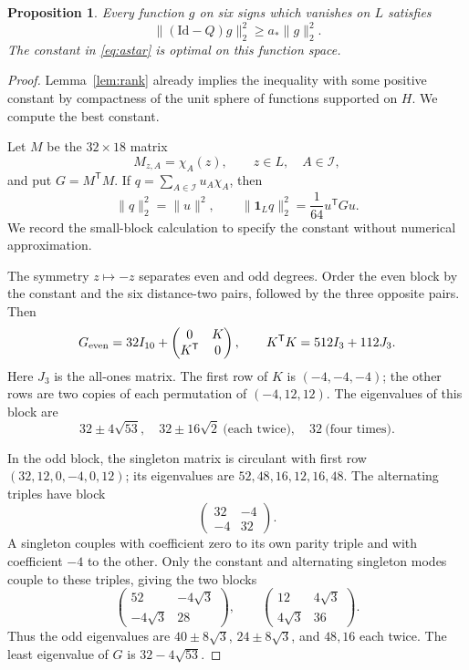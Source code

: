 \documentclass[11pt]{amsart}
\newtheorem{proposition}[theorem]{Proposition}
\theoremstyle{remark}
\newcommand{\one}{\mathbf 1}
\newcommand{\Id}{\mathrm{Id}}
\newcommand{\cI}{\mathcal I}
\newcommand{\astar}{a_*}
\begin{document}
\begin{proposition}\label{prop:coercivity}
Every function $g$ on six signs which vanishes on $L$ satisfies
\begin{equation}\label{eq:coercivity}
 \|(\Id-Q)g\|_2^2\ge\astar\|g\|_2^2.
\end{equation}
The constant in \eqref{eq:astar} is optimal on this function space.
\end{proposition}
\begin{proof}
Lemma~\ref{lem:rank} already implies the inequality with some positive constant by compactness of the unit sphere of functions supported on $H$. We compute the best constant.

Let $M$ be the $32\times18$ matrix
\[
 M_{z,A}=\chi_A(z),\qquad z\in L,\quad A\in\cI,
\]
and put $G=M^{\mathsf T}M$. If $q=\sum_{A\in\cI}u_A\chi_A$, then
\begin{equation}\label{eq:gramnorm}
 \|q\|_2^2=\|u\|^2,\qquad
 \|\one_Lq\|_2^2=\frac1{64}u^{\mathsf T}Gu.
\end{equation}
We record the small-block calculation to specify the constant without numerical approximation.

The symmetry $z\mapsto-z$ separates even and odd degrees. Order the even block by the constant and the six distance-two pairs, followed by the three opposite pairs. Then
\[
 G_{\rm even}=32I_{10}+
 \begin{pmatrix}0&K\\K^{\mathsf T}&0\end{pmatrix},
 \qquad K^{\mathsf T}K=512I_3+112J_3.
\]
Here $J_3$ is the all-ones matrix. The first row of $K$ is $(-4,-4,-4)$; the other rows are two copies of each permutation of $(-4,12,12)$. The eigenvalues of this block are
\[
 32\pm4\sqrt{53},\quad
 32\pm16\sqrt2\ \text{(each twice)},\quad
 32\ \text{(four times)}.
\]

In the odd block, the singleton matrix is circulant with first row $(32,12,0,-4,0,12)$; its eigenvalues are $52,48,16,12,16,48$. The alternating triples have block
\[
 \begin{pmatrix}32&-4\\-4&32\end{pmatrix}.
\]
A singleton couples with coefficient zero to its own parity triple and with coefficient $-4$ to the other. Only the constant and alternating singleton modes couple to these triples, giving the two blocks
\[
 \begin{pmatrix}52&-4\sqrt3\\-4\sqrt3&28\end{pmatrix},
 \qquad
 \begin{pmatrix}12&4\sqrt3\\4\sqrt3&36\end{pmatrix}.
\]
Thus the odd eigenvalues are $40\pm8\sqrt3$, $24\pm8\sqrt3$, and $48,16$ each twice. The least eigenvalue of $G$ is $32-4\sqrt{53}$.


\end{proof}
\end{document}
